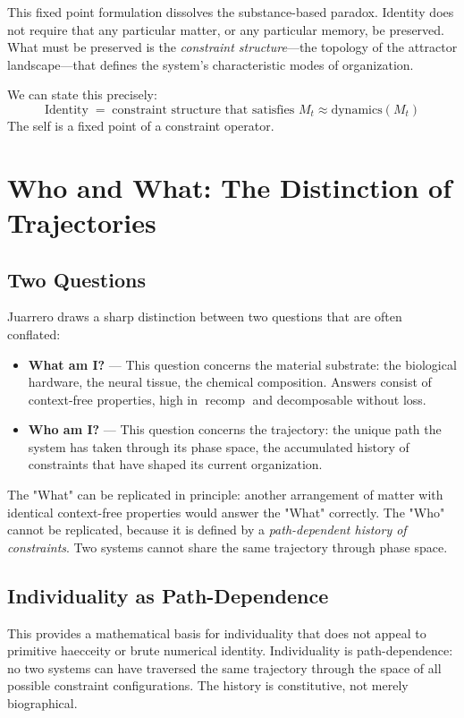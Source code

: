 \documentclass[11pt]{article}
\newcommand{\recomp}{\operatorname{recomp}}
\begin{document}
This fixed point formulation dissolves the substance-based paradox. Identity does not
require that any particular matter, or any particular memory, be preserved. What must be
preserved is the \emph{constraint structure}—the topology of the attractor landscape—that
defines the system's characteristic modes of organization.

We can state this precisely:
\[
\text{Identity} \;=\; \text{constraint structure that satisfies } M_t \approx \mathrm{dynamics}(M_t)
\]
The self is a fixed point of a constraint operator.

\section{Who and What: The Distinction of Trajectories}

\subsection{Two Questions}

Juarrero draws a sharp distinction between two questions that are often conflated:

\begin{itemize}
  \item \textbf{What am I?} — This question concerns the material substrate: the
        biological hardware, the neural tissue, the chemical composition. Answers consist
        of context-free properties, high in $\recomp$ and decomposable without loss.
  \item \textbf{Who am I?} — This question concerns the trajectory: the unique path the
        system has taken through its phase space, the accumulated history of constraints
        that have shaped its current organization.
\end{itemize}

The "What" can be replicated in principle: another arrangement of matter with identical
context-free properties would answer the "What" correctly. The "Who" cannot be replicated,
because it is defined by a \emph{path-dependent history of constraints}. Two systems
cannot share the same trajectory through phase space.

\subsection{Individuality as Path-Dependence}

This provides a mathematical basis for individuality that does not appeal to primitive
haecceity or brute numerical identity. Individuality is path-dependence: no two systems
can have traversed the same trajectory through the space of all possible constraint
configurations. The history is constitutive, not merely biographical.
\end{document}
